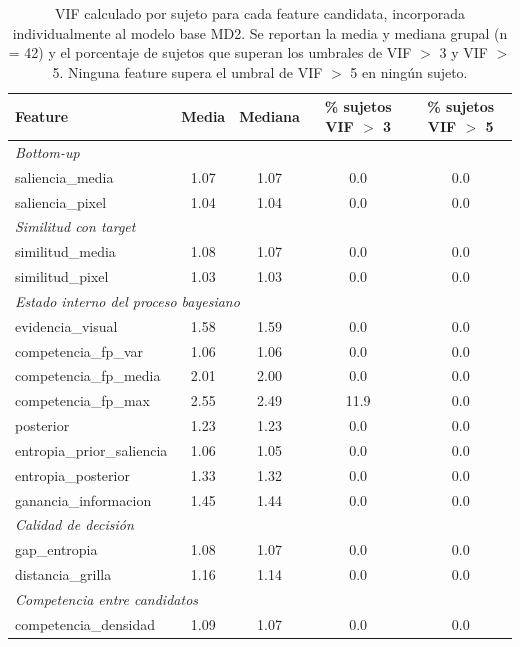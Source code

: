 \begin{table}[H]
\centering
\small
\begin{tabular}{lcccc}
\toprule
\textbf{Feature} & \textbf{Media} & \textbf{Mediana} & \textbf{\% sujetos VIF $>$ 3} & \textbf{\% sujetos VIF $>$ 5} \\
\midrule
\multicolumn{5}{l}{\textit{Bottom-up}} \\
saliencia\_media        & 1.07 & 1.07 & 0.0 & 0.0 \\
saliencia\_pixel        & 1.04 & 1.04 & 0.0 & 0.0 \\
\midrule
\multicolumn{5}{l}{\textit{Similitud con target}} \\
similitud\_media        & 1.08 & 1.07 & 0.0 & 0.0 \\
similitud\_pixel        & 1.03 & 1.03 & 0.0 & 0.0 \\
\midrule
\multicolumn{5}{l}{\textit{Estado interno del proceso bayesiano}} \\
evidencia\_visual       & 1.58 & 1.59 & 0.0 & 0.0 \\
competencia\_fp\_var    & 1.06 & 1.06 & 0.0 & 0.0 \\
competencia\_fp\_media  & 2.01 & 2.00 & 0.0 & 0.0 \\
competencia\_fp\_max    & 2.55 & 2.49 & 11.9 & 0.0 \\
posterior               & 1.23 & 1.23 & 0.0 & 0.0 \\
entropia\_prior\_saliencia & 1.06 & 1.05 & 0.0 & 0.0 \\
entropia\_posterior     & 1.33 & 1.32 & 0.0 & 0.0 \\
ganancia\_informacion   & 1.45 & 1.44 & 0.0 & 0.0 \\
\midrule
\multicolumn{5}{l}{\textit{Calidad de decisión}} \\
gap\_entropia           & 1.08 & 1.07 & 0.0 & 0.0 \\
distancia\_grilla       & 1.16 & 1.14 & 0.0 & 0.0 \\
\midrule
\multicolumn{5}{l}{\textit{Competencia entre candidatos}} \\
competencia\_densidad   & 1.09 & 1.07 & 0.0 & 0.0 \\
\bottomrule
\end{tabular}
\caption{VIF calculado por sujeto para cada feature candidata, 
incorporada individualmente al modelo base MD2. Se reportan la 
media y mediana grupal (n = 42) y el porcentaje de sujetos que 
superan los umbrales de VIF $>$ 3 y VIF $>$ 5. Ninguna feature 
supera el umbral de VIF $>$ 5 en ningún sujeto.}
\label{tab:vif_features}
\end{table}

